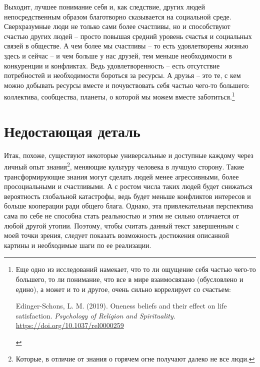 \documentclass[12pt,a4paper]{report}
\begin{document}
\noindent Выходит, лучшее понимание себя и, как следствие, других людей непосредственным образом благотворно сказывается на социальной среде. Сверхразумные люди не только сами более счастливы, но и способствуют счастью других людей -- просто повышая средний уровень счастья и социальных связей в обществе. А чем более мы счастливы -- то есть удовлетворены жизнью здесь и сейчас -- и чем больше у нас друзей, тем меньше необходимости в конкуренции и конфликтах. Ведь удовлетворенность -- есть отсутствие потребностей и необходимости бороться за ресурсы. А друзья -- это те, с кем можно добывать ресурсы вместе и почувствовать себя частью чего-то большего: коллектива, сообщества, планеты, о которой мы можем вместе заботиться.\footnote{Еще одно из исследований намекает, что то ли ощущение себя частью чего-то большего, то ли понимание, что все в мире взаимосвязано (обусловлено и едино), а может и то и другое, очень сильно коррелирует со счастьем:
\begin{compactitem}
  \item Edinger-Schons, L. M. (2019). Oneness beliefs and their effect on life satisfaction. \emph{Psychology of Religion and Spirituality.} \url{https://doi.org/10.1037/rel0000259}
\end{compactitem}\vspace{-1.3em}}

\section*{Недостающая деталь}

Итак, похоже, существуют некоторые универсальные и доступные каждому через личный опыт знания\footnote{Которые, в отличие от знания о горячем огне получают далеко не все люди.}, меняющие культуру человека в лучшую сторону. Такие трансформирующие знания могут сделать людей менее агрессивными, более просоциальными и счастливыми. А с ростом числа таких людей будет снижаться вероятность глобальной катастрофы, ведь будет меньше конфликтов интересов и больше кооперации ради общего блага. Однако, эта привлекательная перспектива сама по себе не способна стать реальностью и этим не сильно отличается от любой другой утопии. Поэтому, чтобы считать данный текст завершенным с моей точки зрения, следует показать возможность достижения описанной картины и необходимые шаги по ее реализации.
\end{document}
